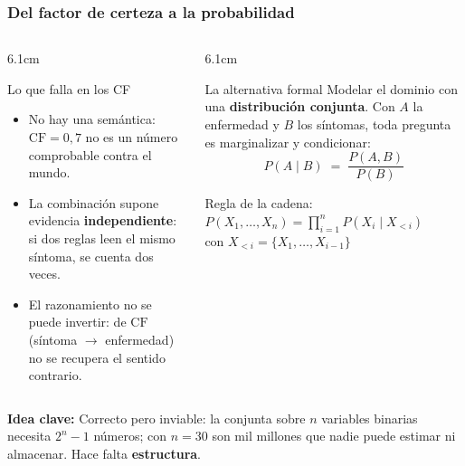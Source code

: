 \documentclass[aspectratio=169, 10pt]{beamer}
\newcommand{\formula}[1]{%
	\begin{tcolorbox}[colback=UCMBlue!8, colframe=UCMBlue, arc=4pt,
		boxsep=2pt, left=6pt, right=6pt, top=3pt, bottom=3pt]
		#1
	\end{tcolorbox}
}
\newcommand{\idea}[1]{%
	\begin{tcolorbox}[colback=AccentGreen!6, colframe=AccentGreen, arc=3pt,
		width=\textwidth, boxsep=1pt, left=5pt, right=5pt, top=2pt, bottom=2pt,
		fontupper=\small]
		\RaggedRight\textbf{Idea clave:} #1
	\end{tcolorbox}
}
\begin{document}
\begin{frame}
\frametitle{Del factor de certeza a la probabilidad}
\begin{columns}[T]
\begin{column}{6.1cm}
\begin{alertblock}{Lo que falla en los CF}
\footnotesize
\begin{itemize}
	\item No hay una semántica: $\mathrm{CF}=0{,}7$ no es un número comprobable contra el mundo.
	\item La combinación supone evidencia \textbf{independiente}: si dos reglas leen el mismo síntoma, se cuenta dos veces.
	\item El razonamiento no se puede invertir: de $\mathrm{CF}$(síntoma $\to$ enfermedad) no se recupera el sentido contrario.
\end{itemize}
\end{alertblock}
\end{column}
\begin{column}{6.1cm}
\begin{block}{La alternativa formal}
\footnotesize
Modelar el dominio con una \textbf{distribución conjunta}. Con $A$ la enfermedad y $B$ los síntomas, toda pregunta es marginalizar y condicionar:
\vspace{-0.4em}
\[
P(A \mid B) \;=\; \frac{P(A, B)}{P(B)}
\]
\vspace{-1.2em}
\end{block}
\vspace{-0.2em}
\formula{\footnotesize\centering Regla de la cadena:\\[3pt]
$\displaystyle P(X_1,\dots,X_n)=\prod_{i=1}^{n} P(X_i \mid X_{<i})$\\[3pt]
{\scriptsize con $X_{<i} = \{X_1,\dots,X_{i-1}\}$}}
\end{column}
\end{columns}
\vspace{0.2em}
\idea{Correcto pero inviable: la conjunta sobre $n$ variables binarias necesita $2^{n}-1$ números; con $n=30$ son mil millones que nadie puede estimar ni almacenar. Hace falta \textbf{estructura}.}
\end{frame}
\end{document}
